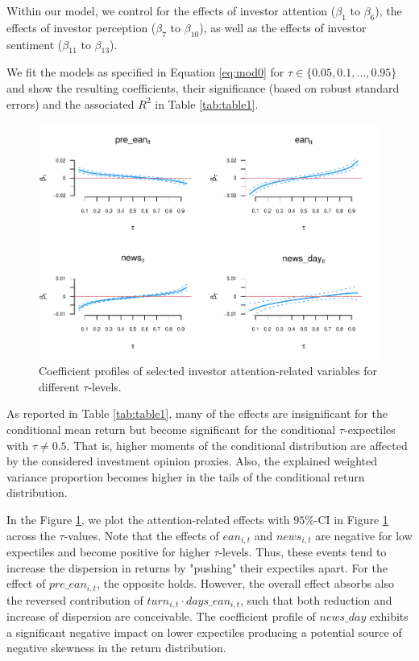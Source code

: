 \documentclass[11pt]{article}
\begin{document}
Within our model, we control for the effects of investor attention (\(\beta_1\) to \(\beta_6\)), the effects of investor perception (\(\beta_7\) to \(\beta_{10}\)), as well as the effects of investor sentiment (\(\beta_{11}\) to \(\beta_{13}\)).

We fit the models as specified in Equation \eqref{eq:mod0} for \(\tau\in\{0.05,0.1,\ldots,0.95\}\) and show the resulting coefficients, their significance (based on robust standard errors) and the associated \(R^2\) in Table \ref{tab:table1}.

\begin{figure}[h!]
\centering
\includegraphics{sentiment_analysis_files/figure-latex/figure1-1.pdf}
\caption{\label{fig:figure1}Coefficient profiles of selected investor attention-related variables for different \(\tau\)-levels.}
\end{figure}

As reported in Table \ref{tab:table1}, many of the effects are insignificant for the conditional mean return but become significant for the conditional \(\tau\)-expectiles with \(\tau\not=0.5\). That is, higher moments of the conditional distribution are affected by the considered investment opinion proxies. Also, the explained weighted variance proportion becomes higher in the tails of the conditional return distribution.

In the Figure \ref{fig:figure1}, we plot the attention-related effects with \(95\%\)-CI in Figure \ref{fig:figure1} across the \(\tau\)-values.
Note that the effects of $ean_{i,t}$ and $news_{i,t}$ are negative for low expectiles and become positive for higher $\tau$-levels. Thus, these events tend to increase the dispersion in returns by "pushing" their expectiles apart. For the effect of $pre\_ean_{i,t}$, the opposite holds. However, the overall effect absorbs also the reversed contribution of $turn_{i,t}\cdot days\_ean_{i,t}$, such that both reduction and increase of dispersion are conceivable. The coefficient profile of $news\_day$ exhibits a significant negative impact on lower expectiles producing a potential source of negative skewness in the return distribution.
\end{document}
